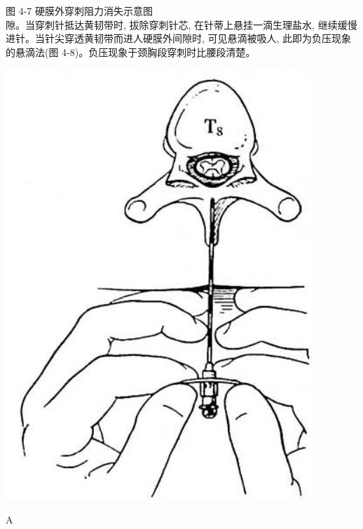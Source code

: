 \documentclass[10pt]{article}
\begin{document}
图 4-7 硬膜外穿刺阻力消失示意图\\
隙。当穿刺针抵达黄韧带时, 拔除穿刺针芯, 在针蒂上悬挂一滴生理盐水, 继续缓慢进针。当针尖穿透黄韧带而进人硬膜外间隙时, 可见悬滴被吸人, 此即为负压现象的悬滴法(图 4-8)。负压现象于颈胸段穿刺时比腰段清楚。

\begin{center}
\includegraphics[max width=\textwidth]{2024_07_09_002a177993bd97d1d6d7g-066}
\end{center}

A
\end{document}
